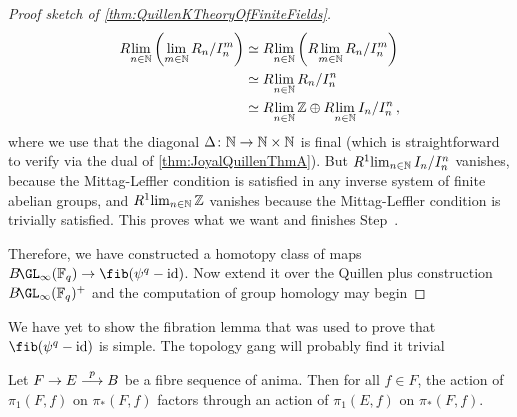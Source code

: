 \begin{proof}[Proof sketch of \cref{thm:QuillenKTheoryOfFiniteFields}]
	\begin{align*}
		R\!\operatorname*{lim}_{n\in\mathbb{N}}\left(\operatorname*{lim}_{m\in\mathbb{N}}R_n/I_n^m\right)&\simeq R\!\operatorname*{lim}_{n\in\mathbb{N}}\left(R\!\operatorname*{lim}_{m\in\mathbb{N}}R_n/I_n^m\right)\\
		&\simeq R\!\operatorname*{lim}_{n\in\mathbb{N}}R_n/I_n^n\\
		&\simeq R\!\operatorname*{lim}_{n\in\mathbb{N}}\mathbb{Z}\oplus R\!\operatorname*{lim}_{n\in\mathbb{N}}I_n/I_n^n	\,,
	\end{align*}
	where we use that the diagonal $\Delta\colon \IN\morphism \IN\times\IN$ is final (which is straightforward to verify via the dual of \cref{thm:JoyalQuillenThmA}). But $R^1\!\operatorname*{lim}_{n\in\mathbb{N}}I_n/I_n^n$ vanishes, because the Mittag-Leffler condition is satisfied in any inverse system of finite abelian groups, and $R^1\!\operatorname*{lim}_{n\in\mathbb{N}}\mathbb{Z}$ vanishes because the Mittag-Leffler condition is trivially satisfied. This proves what we want and finishes Step~.
	
	Therefore, we have constructed a homotopy class of maps $B\!\GL_\infty(\IF_q)\morphism \fib(\psi^q-\id)$. Now extend it over the Quillen plus construction $B\!\GL_\infty(\IF_q)^+$ and the computation of group homology may begin \dotso
\end{proof}
We have yet to show the fibration lemma that was used to prove that $\fib(\psi^q-\id)$ is simple. The topology gang will probably find it trivial \dotso
\begin{lem*}\label{lem*:ActionOfPi1F}
	Let $F\morphism E\morphism[p] B$ be a fibre sequence of anima. Then for all $f\in F$, the action of $\pi_1(F,f)$ on $\pi_*(F,f)$ factors through an action of $\pi_1(E,f)$ on $\pi_*(F,f)$.
\end{lem*}
